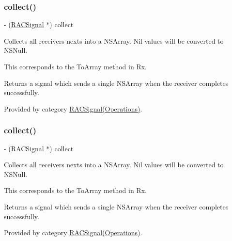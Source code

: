 \subsubsection{\texorpdfstring{collect()}{collect()}\hspace{0.1cm}{\footnotesize\ttfamily [2/3]}}
{\footnotesize\ttfamily -\/ (\mbox{\hyperlink{interface_r_a_c_signal}{R\+A\+C\+Signal}} $\ast$) collect \begin{DoxyParamCaption}{ }\end{DoxyParamCaption}}

Collects all receiver\textquotesingle{}s {\ttfamily next}s into a N\+S\+Array. Nil values will be converted to N\+S\+Null.

This corresponds to the {\ttfamily To\+Array} method in Rx.

Returns a signal which sends a single N\+S\+Array when the receiver completes successfully. 

Provided by category \mbox{\hyperlink{category_r_a_c_signal_07_operations_08_a70b8f976dc0ece9b82e47cdb346a3a09}{R\+A\+C\+Signal(\+Operations)}}.

\mbox{\label{interface_r_a_c_signal_a70b8f976dc0ece9b82e47cdb346a3a09}} 
\subsubsection{\texorpdfstring{collect()}{collect()}\hspace{0.1cm}{\footnotesize\ttfamily [3/3]}}
{\footnotesize\ttfamily -\/ (\mbox{\hyperlink{interface_r_a_c_signal}{R\+A\+C\+Signal}} $\ast$) collect \begin{DoxyParamCaption}{ }\end{DoxyParamCaption}}

Collects all receiver\textquotesingle{}s {\ttfamily next}s into a N\+S\+Array. Nil values will be converted to N\+S\+Null.

This corresponds to the {\ttfamily To\+Array} method in Rx.

Returns a signal which sends a single N\+S\+Array when the receiver completes successfully. 

Provided by category \mbox{\hyperlink{category_r_a_c_signal_07_operations_08_a70b8f976dc0ece9b82e47cdb346a3a09}{R\+A\+C\+Signal(\+Operations)}}.

\mbox{\label{interface_r_a_c_signal_a8a7a563a48665fb1203e2b37db6e5e98}} 
